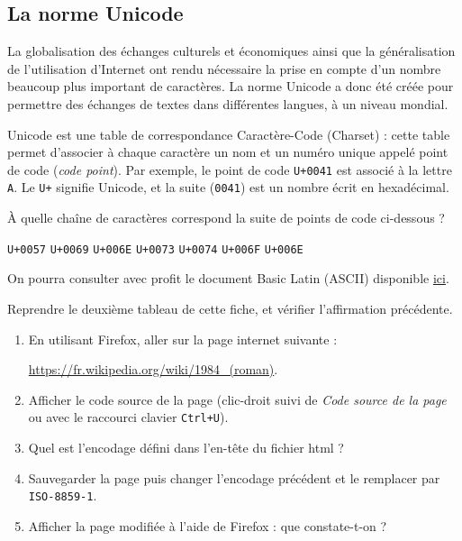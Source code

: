 \documentclass[a4paper,dvipsnames]{article}
\begin{document}
\subsection{La norme Unicode}
La globalisation des échanges culturels et économiques ainsi que la généralisation de l'utilisation d'Internet ont rendu nécessaire la prise en compte d'un nombre beaucoup plus important de caractères. La norme Unicode a donc été créée pour permettre des échanges de textes dans différentes langues, à un niveau mondial.

\smallskip

Unicode est une table de correspondance Caractère-Code (Charset) : cette table permet d'associer à chaque caractère un nom et un \og{}numéro\fg{} unique appelé \og{}point de code\fg{} (\textit{code point}). Par exemple, le point de code \verb|U+0041| est associé à la lettre \verb|A|. Le \verb|U+| signifie \og{}Unicode\fg{}, et la suite (\verb|0041|) est un nombre écrit en hexadécimal.

\medskip

\begin{exercice}{}{}
  À quelle chaîne de caractères correspond la suite de points de code ci-dessous ?

  \begin{center}
    \verb|U+0057| \verb|U+0069| \verb|U+006E| \verb|U+0073| \verb|U+0074| \verb|U+006F| \verb|U+006E|
  \end{center}

  On pourra consulter avec profit le document \og{}Basic Latin (ASCII)\fg{} disponible \href{http://www.unicode.org/charts/}{ici}.
\end{exercice}

\medskip

\begin{exercice}{}{}
  Reprendre le deuxième tableau de cette fiche, et vérifier l'affirmation précédente.
\end{exercice}

\medskip

\begin{activite}{}{}
  \begin{enumerate}
    \item En utilisant Firefox, aller sur la page internet suivante : 

      \begin{center}
        \url{https://fr.wikipedia.org/wiki/1984_(roman)}.
      \end{center}

    \item Afficher le code source de la page (clic-droit suivi de \textit{Code source de la page} ou avec le raccourci clavier \verb|Ctrl+U|).
    \item Quel est l'encodage défini dans l'en-tête du fichier html ?
    \item Sauvegarder la page puis changer l'encodage précédent et le remplacer par \verb|ISO-8859-1|.
    \item Afficher la page modifiée à l'aide de Firefox : que constate-t-on ?
  \end{enumerate}
\end{activite}
\end{document}
